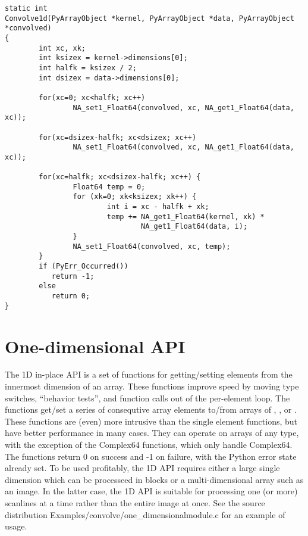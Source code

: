 \begin{verbatim}
static int
Convolve1d(PyArrayObject *kernel, PyArrayObject *data, PyArrayObject *convolved)
{
        int xc, xk;
        int ksizex = kernel->dimensions[0];
        int halfk = ksizex / 2;
        int dsizex = data->dimensions[0];

        for(xc=0; xc<halfk; xc++)
                NA_set1_Float64(convolved, xc, NA_get1_Float64(data, xc));
                     
        for(xc=dsizex-halfk; xc<dsizex; xc++)
                NA_set1_Float64(convolved, xc, NA_get1_Float64(data, xc));

        for(xc=halfk; xc<dsizex-halfk; xc++) {
                Float64 temp = 0;
                for (xk=0; xk<ksizex; xk++) {
                        int i = xc - halfk + xk;
                        temp += NA_get1_Float64(kernel, xk) * 
                                NA_get1_Float64(data, i);
                }
                NA_set1_Float64(convolved, xc, temp);
        }
        if (PyErr_Occurred())
           return -1;
        else 
           return 0;
}
\end{verbatim}

\section{One-dimensional API}
\label{sec:C-API:One-dimensional-api}

The 1D in-place API is a set of functions for getting/setting elements from the
innermost dimension of an array.  These functions improve speed by moving type
switches, ``behavior tests'', and function calls out of the per-element loop.
The functions get/set a series of consequtive array elements to/from arrays of
, , or .  These functions are
(even) more intrusive than the single element functions, but have better
performance in many cases.  They can operate on arrays of any type, with the
exception of the Complex64 functions, which only handle Complex64.  The
functions return 0 on success and -1 on failure, with the Python error state
already set.  To be used profitably, the 1D API requires either a large single
dimension which can be processeed in blocks or a multi-dimensional array such
as an image.  In the latter case, the 1D API is suitable for processing one (or
more) scanlines at a time rather than the entire image at once.  See the source
distribution Examples/convolve/one_dimensionalmodule.c for an example of usage.

